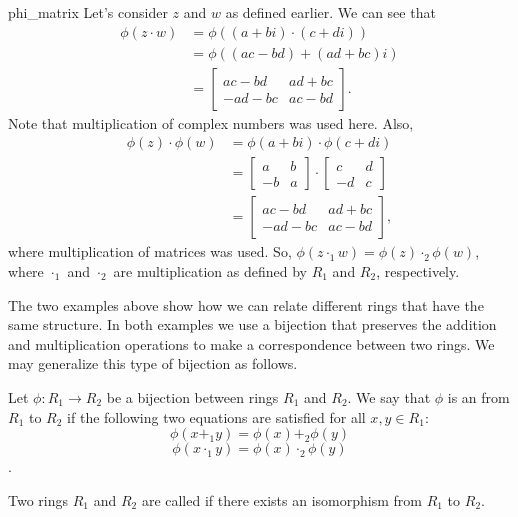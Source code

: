\begin{example}{phi_matrix}
Let's consider $z$ and $w$ as defined earlier.  We can see that
\begin{align*}
\phi(z\cdot w)&=\phi((a+bi)\cdot(c+di))\\
&=\phi((ac-bd)+(ad+bc)i)\\
&=
\begin{bmatrix}
ac-bd & ad+bc\\
-ad-bc & ac-bd
\end{bmatrix}.
\end{align*}
Note that multiplication of complex numbers was used here.  Also,
\begin{align*}
\phi(z)\cdot\phi(w)&=\phi(a+bi)\cdot\phi(c+di)\\
&=
\begin{bmatrix}
a & b\\
-b & a
\end{bmatrix}\cdot
\begin{bmatrix}
c & d\\
-d & c
\end{bmatrix}\\
&=
\begin{bmatrix}
ac-bd & ad+bc\\
-ad-bc & ac-bd
\end{bmatrix}, 
\end{align*}
where multiplication of matrices was used.  So, $\phi(z\cdot_1 w)=\phi(z)\cdot_2\phi(w)$, where $\cdot_1$ and $\cdot_2$ are multiplication as defined by $R_1$ and $R_2$, respectively.   
\end{example}
The two examples above show how we can relate different rings that have the same structure. In both examples we use a bijection that preserves the addition and multiplication operations to make a correspondence between two rings. We may generalize this type of bijection as follows.

\begin{defn}\label{Isomorphism}
Let $\phi:R_1\rightarrow R_2$ be a bijection between rings $R_1$ and $R_2$.  We say that $\phi$ is an  from $R_1$ to $R_2$ if the following two equations are satisfied for all $x,y\in R_1$:
\begin{equation}\label{iso_add}
\phi(x+_1y)=\phi(x)+_2\phi(y)
\end{equation}
\begin{equation}\label{iso_mult}
\phi(x\cdot_1y)=\phi(x)\cdot_2\phi(y)
\end{equation}.

Two rings $R_1$ and $R_2$ are called  if there exists an isomorphism from $R_1$ to $R_2$.
\end{defn}

